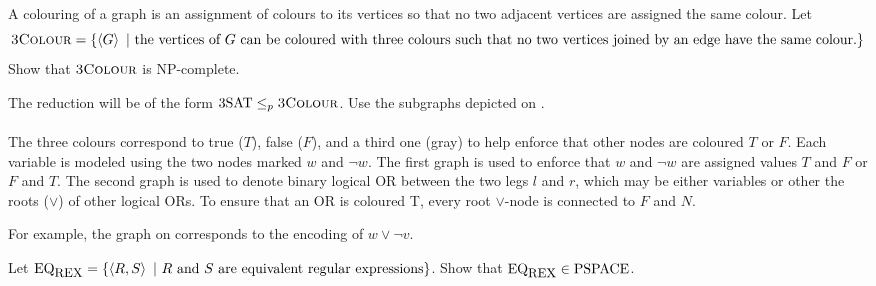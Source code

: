 \documentclass{article}
\begin{document}
\begin{exercise}
A colouring of a graph is an assignment of colours to its vertices so that no two adjacent vertices are assigned the same colour. Let
\begin{equation}
\mbox{\textsc{3Colour}}=\left\{ \left\langle G \right\rangle\ |\ \mbox{the vertices of $G$ can be coloured with three colours such that no two vertices joined by an edge have the same colour.} \right\}
\end{equation}
Show that $\mbox{\textsc{3Colour}}$ is $\mbox{NP-complete}$.
\begin{hint}
The reduction will be of the form $\mbox{3SAT}\leq_p\mbox{\textsc{3Colour}}$. Use the subgraphs depicted on .
\paragraph{}
The three colours correspond to true ($T$), false ($F$), and a third one (gray) to help enforce that other nodes are coloured $T$ or $F$. Each variable is modeled using the two nodes marked $w$ and $\neg w$. The first graph is used to enforce that $w$ and $\neg w$ are assigned values $T$ and $F$ or $F$ and $T$. The second graph is used to denote binary logical OR between the two legs $l$ and $r$, which may be either variables or other the roots ($\vee$) of other logical ORs. To ensure that an OR is coloured T, every root $\vee$-node is connected to $F$ and $N$.
\begin{example}
For example, the graph on  corresponds to the encoding of $w\vee\neg v$.
\end{example}
\end{hint}
\begin{answer}

\end{answer}
\end{exercise}

\begin{exercise}
Let $\mbox{EQ}_{\mbox{\small{REX}}}=\left\{ \left\langle R,S \right\rangle\ |\ \mbox{$R$ and $S$ are equivalent regular expressions} \right\}$. Show that $\mbox{EQ}_{\mbox{\small{REX}}}\in\mbox{PSPACE}$.
\begin{answer}

\end{answer}
\end{exercise}
\end{document}
